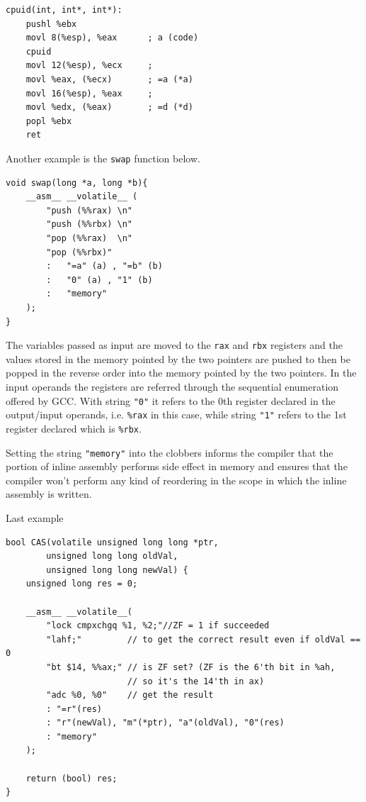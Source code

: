 \documentclass[twoside]{article}
\begin{document}
\begin{verbatim}
cpuid(int, int*, int*):
    pushl %ebx
    movl 8(%esp), %eax      ; a (code)
    cpuid
    movl 12(%esp), %ecx     ;
    movl %eax, (%ecx)       ; =a (*a)
    movl 16(%esp), %eax     ;
    movl %edx, (%eax)       ; =d (*d)
    popl %ebx
    ret 
\end{verbatim}

Another example is the \texttt{swap} function below.

\begin{verbatim}
void swap(long *a, long *b){
    __asm__ __volatile__ (
        "push (%%rax) \n"
        "push (%%rbx) \n"
        "pop (%%rax)  \n"
        "pop (%%rbx)"
        : 	"=a" (a) , "=b" (b)
        :	"0" (a) , "1" (b)
        :	"memory"
    );
} 
\end{verbatim}

The variables passed as input are moved to the \texttt{rax} and \texttt{rbx} registers and the values stored in the memory pointed by the two pointers are pushed to then be popped in the reverse order into the memory pointed by the two pointers. In the input operands the registers are referred through the sequential enumeration offered by GCC. With string \texttt{"0"} it refers to the 0th register declared in the output/input operands, i.e. \texttt{\%rax} in this case, while string \texttt{"1"}
refers to the 1st register declared which is \texttt{\%rbx}.

Setting the string \texttt{"memory"} into the clobbers informs the compiler that the portion of inline assembly performs side effect in memory and ensures that the compiler won't perform any kind of reordering in the scope in which the inline assembly is written.

Last example

\begin{verbatim}
bool CAS(volatile unsigned long long *ptr,
        unsigned long long oldVal,
        unsigned long long newVal) {
    unsigned long res = 0;

    __asm__ __volatile__(
        "lock cmpxchgq %1, %2;"//ZF = 1 if succeeded
        "lahf;"         // to get the correct result even if oldVal == 0
        "bt $14, %%ax;" // is ZF set? (ZF is the 6'th bit in %ah,
                        // so it's the 14'th in ax)
        "adc %0, %0"    // get the result
        : "=r"(res)
        : "r"(newVal), "m"(*ptr), "a"(oldVal), "0"(res)
        : "memory"
	);

    return (bool) res;
}
\end{verbatim}
\end{document}
